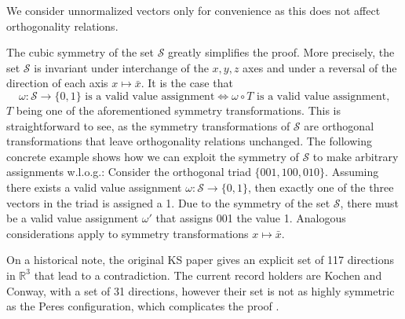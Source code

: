 We consider unnormalized vectors only for convenience as this does not affect orthogonality relations. 

The cubic symmetry of the set $\mathcal{S}$ greatly simplifies the proof. More precisely, the set $\mathcal{S}$ is invariant under interchange of the $x,y,z$ axes and under a reversal of the direction of each axis $x\mapsto\bar{x}$. It is the case that \begin{equation*}
\omega:\mathbb{\mathcal{S}\rightarrow}\{0,1\}\text{ is a valid value assignment}\iff\omega\circ T\text{ is a valid value assignment,}\end{equation*}
$T$ being one of the aforementioned symmetry transformations. This is straightforward to see, as the symmetry transformations of $\mathcal{S}$ are orthogonal transformations that leave orthogonality relations unchanged. The following concrete example shows how we can exploit the symmetry of $\mathcal{S}$ to make arbitrary assignments w.l.o.g.: Consider the orthogonal triad $\{001,100,010\}$. Assuming there exists a valid value assignment $\omega:\mathbb{\mathcal{S}\rightarrow}\{0,1\}$, then exactly one of the three vectors in the triad is assigned a 1. Due to the symmetry of the set $\mathcal{
S}$, there must be a valid value assignment $\omega'$ that assigns 001 the value 1. Analogous considerations apply to symmetry transformations $x\mapsto\bar{x}$. 

On a historical note, the original KS paper \cite{Kochen1968} gives an explicit set of 117 directions in $\mathbb{R}^{3}$ that lead to a contradiction. The current record holders are Kochen and Conway, with a set of 31 directions, however their set is not as highly symmetric as the Peres configuration, which complicates the proof \cite{Peres2002}.

